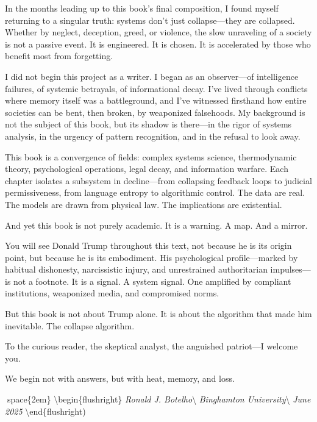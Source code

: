 \documentclass[
]{article}
\author{}
\date{}
\begin{document}
In the months leading up to this book's final composition, I found myself returning to a singular truth: systems don't just collapse---they are collapsed. Whether by neglect, deception, greed, or violence, the slow unraveling of a society is not a passive event. It is engineered. It is chosen. It is accelerated by those who benefit most from forgetting.

I did not begin this project as a writer. I began as an observer---of intelligence failures, of systemic betrayals, of informational decay. I've lived through conflicts where memory itself was a battleground, and I've witnessed firsthand how entire societies can be bent, then broken, by weaponized falsehoods. My background is not the subject of this book, but its shadow is there---in the rigor of systems analysis, in the urgency of pattern recognition, and in the refusal to look away.

This book is a convergence of fields: complex systems science, thermodynamic theory, psychological operations, legal decay, and information warfare. Each chapter isolates a subsystem in decline---from collapsing feedback loops to judicial permissiveness, from language entropy to algorithmic control. The data are real. The models are drawn from physical law. The implications are existential.

And yet this book is not purely academic. It is a warning. A map. And a mirror.

You will see Donald Trump throughout this text, not because he is its origin point, but because he is its embodiment. His psychological profile---marked by habitual dishonesty, narcissistic injury, and unrestrained authoritarian impulses---is not a footnote. It is a signal. A system signal. One amplified by compliant institutions, weaponized media, and compromised norms.

But this book is not about Trump alone. It is about the algorithm that made him inevitable. The collapse algorithm.

To the curious reader, the skeptical analyst, the anguished patriot---I welcome you.

We begin not with answers, but with heat, memory, and loss.

space\{2em\}
\textbackslash begin\{flushright\}
\textit{Ronald J. Botelho}\textbackslash{}
\textit{Binghamton University}\textbackslash{}
\textit{June 2025}
\textbackslash end\{flushright)
\end{document}
